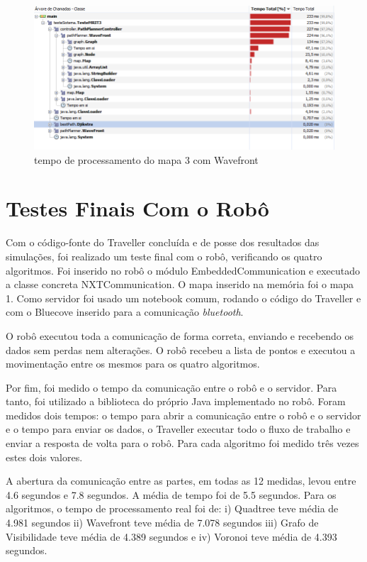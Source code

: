 \begin{figure}[h]
	\centering
	\label{fig50}
		\includegraphics[keepaspectratio=true,scale=0.6]{figuras/wave3.PNG}
	\caption{tempo de processamento do mapa 3 com Wavefront}
\end{figure}

\section{Testes Finais Com o Robô}

Com o código-fonte do Traveller concluída e de posse dos resultados das simulações, foi realizado um teste final com o robô, verificando os quatro algoritmos. Foi inserido no robô o módulo EmbeddedCommunication e executado a classe concreta NXTCommunication. O mapa inserido na memória foi o mapa 1. Como servidor foi usado um notebook comum, rodando o código do Traveller e com o Bluecove inserido para a comunicação \textit{bluetooth}. 

O robô executou toda a comunicação de forma correta, enviando e recebendo os dados sem perdas nem alterações. O robô recebeu a lista de pontos e executou a movimentação entre os mesmos para os quatro algoritmos.

Por fim, foi medido o tempo da comunicação entre o robô e o servidor. Para tanto, foi utilizado a biblioteca do próprio Java implementado no robô. Foram medidos dois tempos: o tempo para abrir a comunicação entre o robô e o servidor e o tempo para enviar os dados, o Traveller executar todo o fluxo de trabalho e enviar a resposta de volta para o robô. Para cada algoritmo foi medido três vezes estes dois valores.

A abertura da comunicação entre as partes, em todas as 12 medidas, levou entre 4.6 segundos e 7.8 segundos. A média de tempo foi de 5.5 segundos. Para os algoritmos, o tempo de processamento real foi de: i) Quadtree teve média de 4.981 segundos ii) Wavefront teve média de 7.078 segundos iii) Grafo de Visibilidade teve média de 4.389 segundos e iv) Voronoi teve média de 4.393 segundos.

